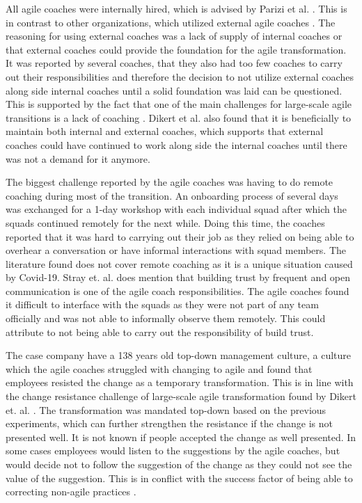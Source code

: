 \documentclass[11pt,a4paper]{report}
\begin{document}
All agile coaches were internally hired, which is advised by Parizi et al. \cite{parizi2014hidden}. This is in contrast to other organizations, which utilized external agile coaches \cite{hanly2006agile} \cite{fry2007large} \cite{benefield2008rolling}. The reasoning for using external coaches was a lack of supply of internal coaches or that external coaches could provide the foundation for the agile transformation. It was reported by several coaches, that they also had too few coaches to carry out their responsibilities and therefore the decision to not utilize external coaches along side internal coaches until a solid foundation was laid can be questioned. This is supported by the fact that one of the main challenges for large-scale agile transitions is a lack of coaching \cite{dikert2016challenges}. Dikert et al. \cite{dikert2016challenges} also found that it is beneficially to maintain both internal and external coaches, which supports that external coaches could have continued to work along side the internal coaches until there was not a demand for it anymore.

The biggest challenge reported by the agile coaches was having to do remote coaching during most of the transition. An onboarding process of several days was exchanged for a 1-day workshop with each individual squad after which the squads continued remotely for the next while. Doing this time, the coaches reported that it was hard to carrying out their job as they relied on being able to overhear a conversation or have informal interactions with squad members. The literature found does not cover remote coaching as it is a unique situation caused by Covid-19. Stray et. al. \cite{stray2020agile} does mention that building trust by frequent and open communication is one of the agile coach responsibilities. The agile coaches found it difficult to interface with the squads as they were not part of any team officially and was not able to informally observe them remotely. This could attribute to not being able to carry out the responsibility of build trust.

The case company have a 138 years old top-down management culture, a culture which the agile coaches struggled with changing to agile and found that employees resisted the change as a temporary transformation. This is in line with the change resistance challenge of large-scale agile transformation found by Dikert et. al. \cite{dikert2016challenges}. The transformation was mandated top-down based on the previous experiments, which can further strengthen the resistance if the change is not presented well. It is not known if people accepted the change as well presented. In some cases employees would listen to the suggestions by the agile coaches, but would decide not to follow the suggestion of the change as they could not see the value of the suggestion. This is in conflict with the success factor of being able to correcting non-agile practices \cite{dikert2016challenges}.
\end{document}
